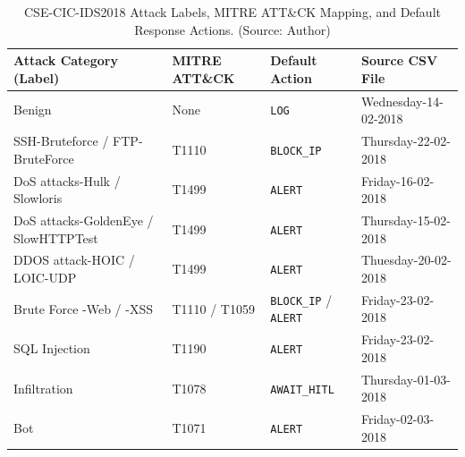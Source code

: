 \begin{table}[!htbp]
    \centering
    \caption{CSE-CIC-IDS2018 Attack Labels, MITRE ATT\&CK Mapping, and Default Response Actions. (Source: Author)}
    \label{tab:dataset_distribution}
    \begin{tabular}{|>{\raggedright\arraybackslash}p{}|>{\centering\arraybackslash}p{}|>{\centering\arraybackslash}p{}|>{\raggedright\arraybackslash}p{}|}
        \hline
        \textbf{Attack Category (Label)} & \textbf{MITRE ATT\&CK} & \textbf{Default Action} & \textbf{Source CSV File} \\
        \hline
        Benign & None & \texttt{LOG} & Wednesday-14-02-2018 \\
        \hline
        SSH-Bruteforce / FTP-BruteForce & T1110 & \texttt{BLOCK\_IP} & Thursday-22-02-2018 \\
        \hline
        DoS attacks-Hulk / Slowloris & T1499 & \texttt{ALERT} & Friday-16-02-2018 \\
        \hline
        DoS attacks-GoldenEye / SlowHTTPTest & T1499 & \texttt{ALERT} & Thursday-15-02-2018 \\
        \hline
        DDOS attack-HOIC / LOIC-UDP & T1499 & \texttt{ALERT} & Thuesday-20-02-2018 \\
        \hline
        Brute Force -Web / -XSS & T1110 / T1059 & \texttt{BLOCK\_IP} / \texttt{ALERT} & Friday-23-02-2018 \\
        \hline
        SQL Injection & T1190 & \texttt{ALERT} & Friday-23-02-2018 \\
        \hline
        Infiltration & T1078 & \texttt{AWAIT\_HITL} & Thursday-01-03-2018 \\
        \hline
        Bot & T1071 & \texttt{ALERT} & Friday-02-03-2018 \\
        \hline
    \end{tabular}
\end{table}

